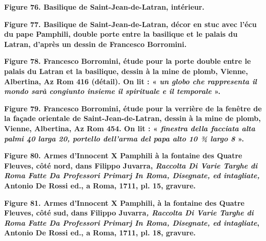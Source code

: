 \documentclass[12pt,twoside,openany]{book}
\begin{document}
\begin{center}
\par\small \textbf{Figure 76. Basilique de Saint-Jean-de-Latran, intérieur.}
\end{center}

\begin{center}
\par\small \textbf{Figure 77. Basilique de Saint-Jean-de-Latran, décor en stuc avec l’écu du pape Pamphili, double porte entre la basilique et le palais du Latran, d’après un dessin de Francesco Borromini.}
\end{center}

\begin{center}
\par\small \textbf{Figure 78. Francesco Borromini, étude pour la porte double entre le palais du Latran et la basilique, dessin à la mine de plomb, Vienne, Albertina, Az Rom 416 (détail). On lit : « \textit{un globo che rappresenta il mondo sarà congiunto insieme il spirituale e il temporale }».}
\end{center}

\begin{center}
\par\small \textbf{Figure 79. Francesco Borromini, étude pour la verrière de la fenêtre de la façade orientale de Saint-Jean-de-Latran, dessin à la mine de plomb, Vienne, Albertina, Az Rom 454. On lit : « \textit{finestra della facciata alta palmi 40 larga 20, portello dell’arma del papa alto 10 ¾ largo 8 }».}
\end{center}

\begin{center}
\par\small \textbf{Figure 80. Armes d’Innocent X Pamphili à la fontaine des Quatre Fleuves, côté nord, dans Filippo Juvarra, \textit{Raccolta Di Varie Targhe di Roma Fatte Da Professori Primarj In Roma, Disegnate, ed intagliate,} Antonio De Rossi ed., a Roma, 1711, pl. 15, gravure.}
\end{center}

\begin{center}
\par\small \textbf{Figure 81. Armes d’Innocent X Pamphili, à la fontaine des Quatre Fleuves, côté sud, dans Filippo Juvarra\textit{, Raccolta Di Varie Targhe di Roma Fatte Da Professori Primarj In Roma, Disegnate, ed intagliate}, Antonio De Rossi ed., a Roma, 1711, pl. 18, gravure.}
\end{center}
\end{document}
